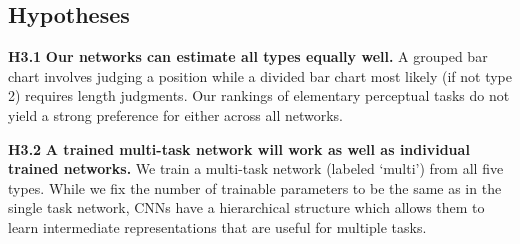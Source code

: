 \subsection{Hypotheses}

\begin{hypolist}
  \item \textbf{H3.1} \textbf{Our networks can estimate all types equally well.} A grouped bar chart involves judging a position while a divided bar chart most likely (if not type 2) requires length judgments. Our rankings of elementary perceptual tasks do not yield a strong preference for either across all networks.
  \item \textbf{H3.2} \textbf{A trained multi-task network will work as well as individual trained networks.} We train a multi-task network (labeled `multi') from all five types. While we fix the number of trainable parameters to be the same as in the single task network, CNNs have a hierarchical structure which allows them to learn intermediate representations that are useful for multiple tasks.
\end{hypolist}


